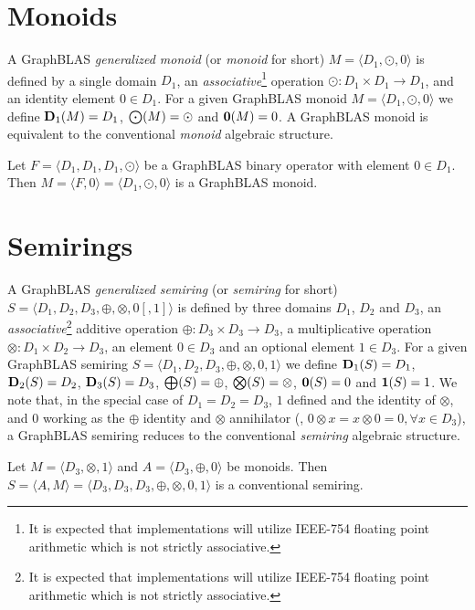 \section{Monoids}

A GraphBLAS \emph{generalized monoid} (or \emph{monoid} for short) $M =
\langle D_1,\odot,0 \rangle$ is defined by a single domain $D_1$, an 
\emph{associative}\footnote{It is expected that implementations 
will utilize IEEE-754 floating point arithmetic which is not 
strictly associative.} 
operation $\odot: D_1 \times D_1 \rightarrow D_1$,
and an identity element $0 \in D_1$.  For a given GraphBLAS monoid $M=\langle
D_1,\odot,0 \rangle$ we define $\bold{D}_1(M) = D_1$, $\bold{\bigodot}(M) =
\odot$ and $\bold{0}(M) = 0$.  A GraphBLAS monoid is equivalent to 
the conventional \emph{monoid} algebraic structure.

Let $F = \langle D_1,D_1,D_1,\odot \rangle$ be a GraphBLAS binary operator
with element $0 \in D_1$.  Then $M = \langle F,0 \rangle = \langle
D_1,\odot,0 \rangle$ is a GraphBLAS monoid.

\section{Semirings}

A GraphBLAS \emph{generalized semiring} (or \emph{semiring} for short)
$S=\langle D_1,D_2,D_3,\oplus,\otimes,0 [,1] \rangle$ is defined by
three domains $D_1$, $D_2$ and $D_3$, an \emph{associative}\footnote{It 
is expected that implementations will utilize IEEE-754 floating 
point arithmetic which is not strictly associative.} 
 additive operation $\oplus : D_3 \times D_3 \rightarrow D_3$, 
a multiplicative operation $\otimes : D_1 \times D_2 \rightarrow
D_3$, an element $0 \in D_3$ and an optional element $1 \in D_3$.
For a given GraphBLAS semiring $S=\langle D_1,
D_2, D_3,\oplus,\otimes,0,1 \rangle$ we define $\bold{D}_1(S) = D_1$,
$\bold{D}_2(S) = D_2$, $\bold{D}_3(S) = D_3$, $\bold{\bigoplus}(S) =
\oplus$, $\bold{\bigotimes}(S) = \otimes$, ${\bf 0}(S) = 0$ and ${\bf 1}(S) =
1$. We note that, in the special case of $D_1 = D_2 = D_3$, $1$ defined 
and the identity of $\otimes$, and $0$ working as the $\oplus$ identity
and $\otimes$ annihilator (\ie, $0 \otimes x = x
\otimes 0 = 0, \forall x \in D_3$), a GraphBLAS semiring reduces to the
conventional \emph{semiring} algebraic structure.

Let $M = \langle D_3, \otimes,1 \rangle$ and $A = \langle D_3,\oplus,0 \rangle$ be monoids.
Then $S= \langle A,M \rangle = \langle D_3,D_3,D_3,\oplus,\otimes,0,1 \rangle$
is a conventional semiring.


